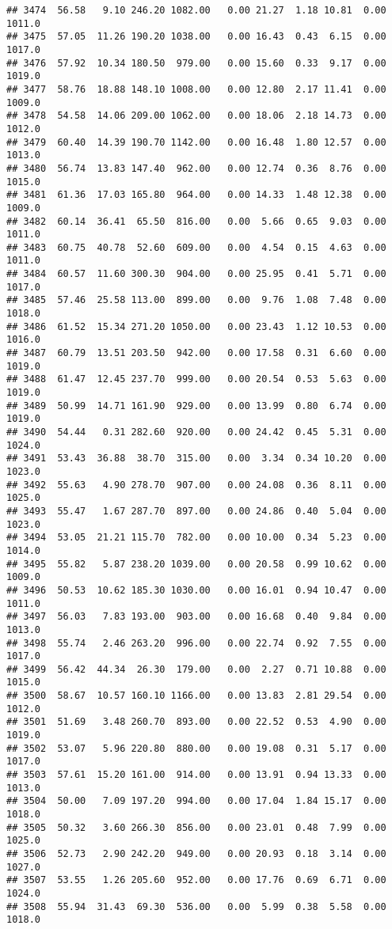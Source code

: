 \documentclass{article}\usepackage{graphicx, color}
\makeatletter
\newenvironment{kframe}{%
 \def\at@end@of@kframe{}%
 \ifinner\ifhmode%
  \def\at@end@of@kframe{\end{minipage}}%
  \begin{minipage}{\columnwidth}%
 \fi\fi%
 \def\FrameCommand##1{\hskip\@totalleftmargin \hskip-\fboxsep
 \colorbox{shadecolor}{##1}\hskip-\fboxsep
     \hskip-\linewidth \hskip-\@totalleftmargin \hskip\columnwidth}%
 \MakeFramed {\advance\hsize-\width
   \@totalleftmargin\z@ \linewidth\hsize
   \@setminipage}}%
 {\par\unskip\endMakeFramed%
 \at@end@of@kframe}
\newenvironment{knitrout}{}{} %
\makeatother
\begin{document}
\begin{knitrout}
\begin{kframe}
\begin{verbatim}
## 3474  56.58   9.10 246.20 1082.00   0.00 21.27  1.18 10.81  0.00 1011.0
## 3475  57.05  11.26 190.20 1038.00   0.00 16.43  0.43  6.15  0.00 1017.0
## 3476  57.92  10.34 180.50  979.00   0.00 15.60  0.33  9.17  0.00 1019.0
## 3477  58.76  18.88 148.10 1008.00   0.00 12.80  2.17 11.41  0.00 1009.0
## 3478  54.58  14.06 209.00 1062.00   0.00 18.06  2.18 14.73  0.00 1012.0
## 3479  60.40  14.39 190.70 1142.00   0.00 16.48  1.80 12.57  0.00 1013.0
## 3480  56.74  13.83 147.40  962.00   0.00 12.74  0.36  8.76  0.00 1015.0
## 3481  61.36  17.03 165.80  964.00   0.00 14.33  1.48 12.38  0.00 1009.0
## 3482  60.14  36.41  65.50  816.00   0.00  5.66  0.65  9.03  0.00 1011.0
## 3483  60.75  40.78  52.60  609.00   0.00  4.54  0.15  4.63  0.00 1011.0
## 3484  60.57  11.60 300.30  904.00   0.00 25.95  0.41  5.71  0.00 1017.0
## 3485  57.46  25.58 113.00  899.00   0.00  9.76  1.08  7.48  0.00 1018.0
## 3486  61.52  15.34 271.20 1050.00   0.00 23.43  1.12 10.53  0.00 1016.0
## 3487  60.79  13.51 203.50  942.00   0.00 17.58  0.31  6.60  0.00 1019.0
## 3488  61.47  12.45 237.70  999.00   0.00 20.54  0.53  5.63  0.00 1019.0
## 3489  50.99  14.71 161.90  929.00   0.00 13.99  0.80  6.74  0.00 1019.0
## 3490  54.44   0.31 282.60  920.00   0.00 24.42  0.45  5.31  0.00 1024.0
## 3491  53.43  36.88  38.70  315.00   0.00  3.34  0.34 10.20  0.00 1023.0
## 3492  55.63   4.90 278.70  907.00   0.00 24.08  0.36  8.11  0.00 1025.0
## 3493  55.47   1.67 287.70  897.00   0.00 24.86  0.40  5.04  0.00 1023.0
## 3494  53.05  21.21 115.70  782.00   0.00 10.00  0.34  5.23  0.00 1014.0
## 3495  55.82   5.87 238.20 1039.00   0.00 20.58  0.99 10.62  0.00 1009.0
## 3496  50.53  10.62 185.30 1030.00   0.00 16.01  0.94 10.47  0.00 1011.0
## 3497  56.03   7.83 193.00  903.00   0.00 16.68  0.40  9.84  0.00 1013.0
## 3498  55.74   2.46 263.20  996.00   0.00 22.74  0.92  7.55  0.00 1017.0
## 3499  56.42  44.34  26.30  179.00   0.00  2.27  0.71 10.88  0.00 1015.0
## 3500  58.67  10.57 160.10 1166.00   0.00 13.83  2.81 29.54  0.00 1012.0
## 3501  51.69   3.48 260.70  893.00   0.00 22.52  0.53  4.90  0.00 1019.0
## 3502  53.07   5.96 220.80  880.00   0.00 19.08  0.31  5.17  0.00 1017.0
## 3503  57.61  15.20 161.00  914.00   0.00 13.91  0.94 13.33  0.00 1013.0
## 3504  50.00   7.09 197.20  994.00   0.00 17.04  1.84 15.17  0.00 1018.0
## 3505  50.32   3.60 266.30  856.00   0.00 23.01  0.48  7.99  0.00 1025.0
## 3506  52.73   2.90 242.20  949.00   0.00 20.93  0.18  3.14  0.00 1027.0
## 3507  53.55   1.26 205.60  952.00   0.00 17.76  0.69  6.71  0.00 1024.0
## 3508  55.94  31.43  69.30  536.00   0.00  5.99  0.38  5.58  0.00 1018.0

\end{verbatim}
\end{kframe}
\end{knitrout}
\end{document}
